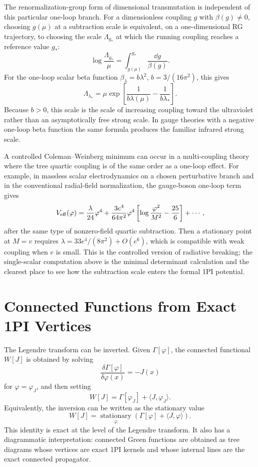 The renormalization-group form of dimensional transmutation is independent of
this particular one-loop branch.  For a dimensionless coupling \(g\) with
\(\beta(g)\neq0\), choosing \(g(\mu)\) at a subtraction scale is equivalent,
on a one-dimensional RG trajectory, to choosing the scale \(\Lambda_{g_*}\)
at which the running coupling reaches a reference value \(g_*\):
\begin{equation}
  \log\frac{\Lambda_{g_*}}{\mu}
  =
  \int_{g(\mu)}^{g_*}\frac{\dd g}{\beta(g)}.
  \label{eq:dimensional-transmutation-rg-scale}
\end{equation}
For the one-loop scalar beta function \( \beta_\lambda=b\lambda^2\),
\(b=3/(16\pi^2)\), this gives
\[
  \Lambda_{\lambda_*}
  =
  \mu
  \exp\!\left[
    \frac{1}{b\lambda(\mu)}
    -
    \frac{1}{b\lambda_*}
  \right].
\]
Because \(b>0\), this scale is the scale of increasing coupling toward the
ultraviolet rather than an asymptotically free strong scale.  In gauge theories
with a negative one-loop beta function the same formula produces the familiar
infrared strong scale.

A controlled Coleman--Weinberg minimum can occur in a multi-coupling theory
where the tree quartic coupling is of the same order as a one-loop effect.
For example, in massless scalar electrodynamics on a chosen perturbative
branch and in the conventional radial-field normalization, the gauge-boson
one-loop term gives
\[
  V_{\rm eff}(\varphi)
  =
  \frac{\lambda}{24}\varphi^4
  +
  \frac{3e^4}{64\pi^2}\varphi^4
  \left[
    \log\frac{\varphi^2}{M^2}
    -\frac{25}{6}
  \right]
  +\cdots ,
\]
after the same type of nonzero-field quartic subtraction.  Then a stationary
point at \(M=v\) requires \(\lambda=33e^4/(8\pi^2)+O(e^6)\), which is
compatible with weak coupling when \(e\) is small.  This is the controlled
version of radiative breaking; the single-scalar computation above is the
minimal determinant calculation and the clearest place to see how the
subtraction scale enters the formal 1PI potential.

\section{Connected Functions from Exact 1PI Vertices}

The Legendre transform can be inverted.  Given \(\Gamma[\varphi]\), the
connected functional \(W[J]\) is obtained by solving
\[
  \frac{\delta\Gamma[\varphi]}{\delta\varphi(x)}
  =
  -J(x)
\]
for \(\varphi=\varphi_J\), and then setting
\[
  W[J]
  =
  \Gamma[\varphi_J]
  +
  \langle J,\varphi_J\rangle .
\]
Equivalently, the inversion can be written as the stationary value
\[
  W[J]
  =
  \operatorname*{stationary}_{\varphi}
  \left(
    \Gamma[\varphi]
    +
    \langle J,\varphi\rangle
  \right).
\]
This identity is exact at the level of the Legendre transform.  It also has a
diagrammatic interpretation: connected Green functions are obtained as tree
diagrams whose vertices are exact 1PI kernels and whose internal lines are the
exact connected propagator.

